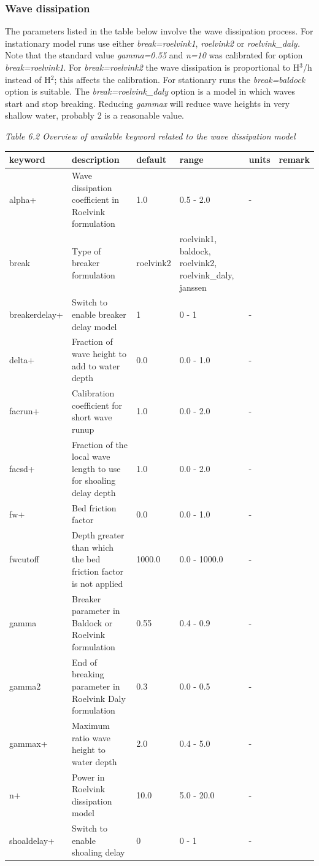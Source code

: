 \documentclass{article}
\begin{document}
\subsubsection{ Wave dissipation}

\noindent The parameters listed in the table below involve the wave dissipation process. For instationary model runs use either \textit{break=roelvink1},\textit{ roelvink2} or\textit{ roelvink\_daly.} Note that the standard value \textit{gamma=0.55} and \textit{n=10} was calibrated for option \textit{break=roelvink1}. For \textit{break=roelvink2} the wave dissipation is proportional to H${}^{3}$/h instead of H${}^{2}$; this affects the calibration. For stationary runs the \textit{break=baldock} option is suitable. The \textit{break=roelvink\_daly} option is a model in which waves start and stop breaking. Reducing \textit{gammax} will reduce wave heights in very shallow water, probably 2 is a reasonable value.

\noindent \textit{Table 6.2 Overview of available keyword related to the wave dissipation model}

\begin{tabular}{|p{0.8in}|p{0.8in}|p{0.6in}|p{0.9in}|p{0.4in}|p{0.5in}|} \hline 
keyword & description & default & range & units & remark \\ \hline 
alpha+ & Wave dissipation coefficient in Roelvink formulation & 1.0 & 0.5 - 2.0 & - &  \\ \hline 
break & Type of breaker formulation & roelvink2 & roelvink1, baldock, roelvink2, roelvink\_daly, janssen &  &  \\ \hline 
breakerdelay+ & Switch to enable breaker delay model & 1 & 0 - 1 & - &  \\ \hline 
delta+ & Fraction of wave height to add to water depth & 0.0 & 0.0 - 1.0 & - &  \\ \hline 
facrun+ & Calibration coefficient for short wave runup & 1.0 & 0.0 - 2.0 & - &  \\ \hline 
facsd+ & Fraction of the local wave length to use for shoaling delay depth & 1.0 & 0.0 - 2.0 & - &  \\ \hline 
fw+ & Bed friction factor & 0.0 & 0.0 - 1.0 & - &  \\ \hline 
fwcutoff & Depth greater than which the bed friction factor is not applied & 1000.0 & 0.0 - 1000.0 & - &  \\ \hline 
gamma & Breaker parameter in Baldock or Roelvink formulation & 0.55 & 0.4 - 0.9 & - &  \\ \hline 
gamma2 & End of breaking parameter in Roelvink Daly formulation & 0.3 & 0.0 - 0.5 & - &  \\ \hline 
gammax+ & Maximum ratio wave height to water depth & 2.0 & 0.4 - 5.0 & - &  \\ \hline 
n+ & Power in Roelvink dissipation model & 10.0 & 5.0 - 20.0 & - &  \\ \hline 
shoaldelay+ & Switch to enable shoaling delay & 0 & 0 - 1 & - &  \\ \hline 
\end{tabular}
\end{document}
